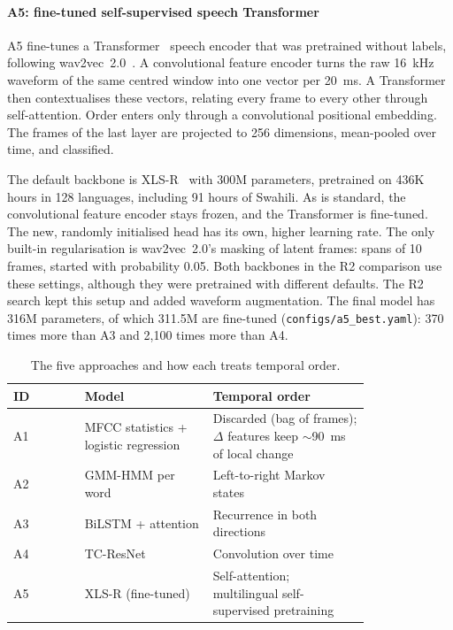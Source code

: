 \paragraph{A5: fine-tuned self-supervised speech Transformer}
A5 fine-tunes a Transformer~\cite{vaswani2017attention} speech encoder that was pretrained without labels, following
wav2vec~2.0~\cite{baevski2020wav2vec}. A convolutional feature encoder turns the raw 16~kHz waveform of the same
centred window into one vector per 20~ms. A Transformer then contextualises these vectors, relating every frame to
every other through self-attention. Order enters only through a convolutional positional embedding. The frames of
the last layer are projected to 256 dimensions, mean-pooled over time, and classified.

The default backbone is XLS-R~\cite{babu2022xlsr} with 300M parameters, pretrained on 436K hours in 128 languages,
including 91 hours of Swahili. As is standard, the convolutional feature encoder stays frozen, and the Transformer
is fine-tuned. The new, randomly initialised head has its own, higher learning rate. The only built-in
regularisation is wav2vec~2.0's masking of latent frames: spans of 10 frames, started with probability 0.05. Both
backbones in the R2 comparison use these settings, although they were pretrained with different
defaults. The R2 search kept this setup and added waveform augmentation. The final model has 316M parameters, of
which 311.5M are fine-tuned (\texttt{configs/a5\_best.yaml}): 370 times more than A3 and 2{,}100 times more than A4.

\begin{table}[t]
  \centering
  \caption{The five approaches and how each treats temporal order.}
  \label{tab:approaches}
  \small
  \begin{tabular}{@{}lp{0.36\linewidth}p{0.44\linewidth}@{}}
    \toprule
    ID & Model & Temporal order \\
    \midrule
    A1 & MFCC statistics + logistic regression & Discarded (bag of frames); $\Delta$ features keep $\sim$90~ms of local change \\
    A2 & GMM-HMM per word & Left-to-right Markov states \\
    A3 & BiLSTM + attention & Recurrence in both directions \\
    A4 & TC-ResNet & Convolution over time \\
    A5 & XLS-R (fine-tuned) & Self-attention; multilingual self-supervised pretraining \\
    \bottomrule
  \end{tabular}
\end{table}

